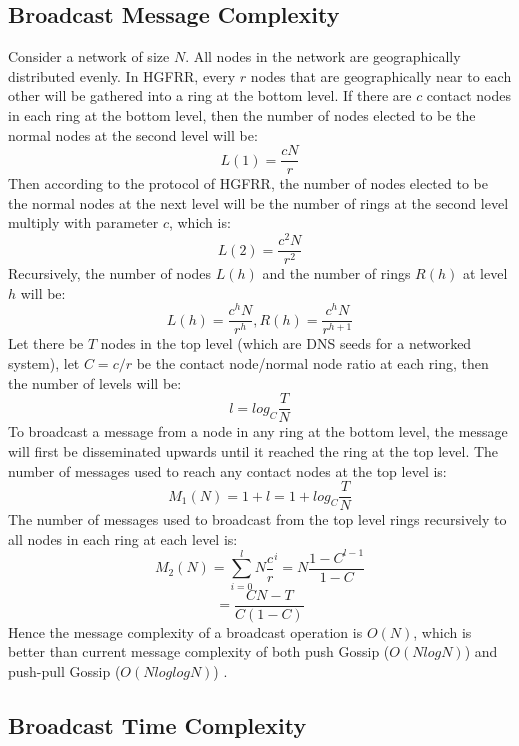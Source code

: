 \subsection{Broadcast Message Complexity}

Consider a network of size $N$. All nodes in the network are geographically distributed evenly. 
In HGFRR, every $r$ nodes that are geographically near to each other will be gathered into a ring at the bottom level. 
If there are $c$ contact nodes in each ring at the bottom level, then the number of nodes elected to be the normal nodes at the second level will be: $$L(1) = \frac{cN}{r}$$ 
Then according to the protocol of HGFRR, the number of nodes elected to be the normal nodes at the next level will be the number of rings at the second level multiply with parameter $c$, which is: $$L(2) = \frac{c^2N}{r^2}$$ 
Recursively, the number of nodes $L(h)$ and the number of rings $R(h)$ at level $h$ will be: $$L(h) = \frac{c^hN}{r^h}, R(h)=\frac{c^hN}{r^{h+1}}$$ 
Let there be $T$ nodes in the top level (which are DNS seeds for a networked system), let $C = c/r$ be the contact node/normal node ratio at each ring, then the number of levels will be: $$l = log_{C}{\frac{T}{N}}$$
To broadcast a message from a node in any ring at the bottom level, the message will first be disseminated upwards until it reached the ring at the top level. The number of messages used to reach any contact nodes at the top level is: $$M_1(N)=1+l=1+log_{C}{\frac{T}{N}}$$
The number of messages used to broadcast from the top level rings recursively to all nodes in each ring at each level is: $$M_2(N)=\sum_{i=0}^{l} N\frac{c}{r}^i=N\frac{1-C^{l-1}}{1-C}$$
$$=\frac{CN-T}{C(1-C)}$$ Hence the message complexity of a broadcast operation is $O(N)$, which is better than current message complexity of both push Gossip ($O(NlogN)$) and push-pull Gossip ($O(NloglogN)$) \cite{jelasity2011gossip}.

\subsection{Broadcast Time Complexity}

